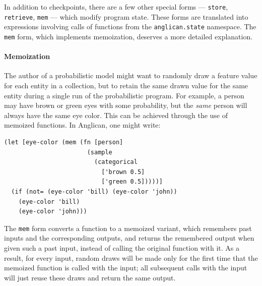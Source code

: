 \documentclass[preprint]{sigplanconf}
\begin{document}
In addition to checkpoints, there are a few other special forms
---  \texttt{store}, \texttt{retrieve}, \texttt{mem} --- which
modify program state. These forms are translated into
expressions involving calls of functions from the
\texttt{anglican.state} namespace. The \texttt{mem} form, which
implements memoization, deserves a more detailed explanation.

\paragraph{Memoization}
The author of a probabilistic model might want to 
randomly draw a feature value for each entity in a collection,
but to retain the same drawn
value for the same entity during a single run of the probabilistic
program. For example, a person may have brown or green eyes
with some probability, but the \textit{same} person will
always have the same eye color. This can be achieved
through the use of memoized functions. In Anglican, one
might write:
\begin{lstlisting}[style=default]
(let [eye-color (mem (fn [person]
                       (sample
                         (categorical
                           ['brown 0.5]
                           ['green 0.5]))))]
  (if (not= (eye-color 'bill) (eye-color 'john))
    (eye-color 'bill)
    (eye-color 'john)))
\end{lstlisting}
The \texttt{mem} form converts a function to a memoized variant,
which remembers past inputs and the corresponding outputs, and 
returns the remembered output when given such a past input, 
instead of calling the original function with it. As a result,
for every input, random draws will be made only for the first time 
that the memoized function is called with the input; all subsequent
calls with the input will just reuse these draws and return the same output.
\end{document}
